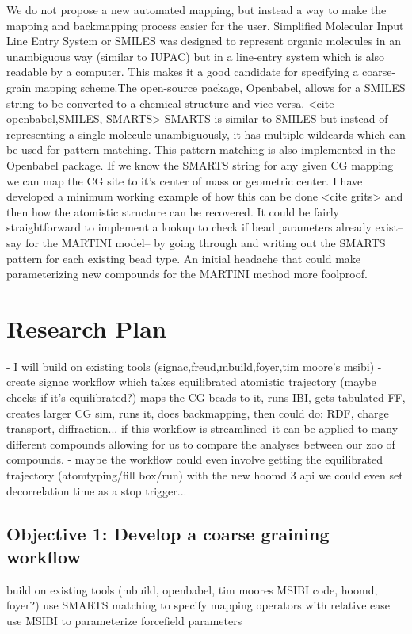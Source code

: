 We do not propose a new automated mapping, but instead a way to make the mapping and backmapping process easier for the user.
Simplified Molecular Input Line Entry System or SMILES \cite{Weininger} was designed to represent organic molecules in an unambiguous way (similar to IUPAC) but in a line-entry system which is also readable by a computer.
This makes it a good candidate for specifying a coarse-grain mapping scheme.The open-source package, Openbabel, allows for a SMILES string to be converted to a chemical structure and vice versa.
<cite openbabel,SMILES, SMARTS> SMARTS is similar to SMILES but instead of representing a single molecule unambiguously, it has multiple wildcards which can be used for pattern matching.
This pattern matching is also implemented in the Openbabel package.
If we know the SMARTS string for any given CG mapping we can map the CG site to it's center of mass or geometric center.
I have developed a minimum working example of how this can be done <cite grits> and then how the atomistic structure can be recovered.
It could be fairly straightforward to implement a lookup to check if bead parameters already exist--say for the MARTINI model-- by going through and writing out the SMARTS pattern for each existing bead type.
An initial headache that could make parameterizing new compounds for the MARTINI method more foolproof.

\section*{Research Plan}
- I will build on existing tools (signac,freud,mbuild,foyer,tim moore's msibi)
- create signac workflow which takes equilibrated atomistic trajectory (maybe checks if it's equilibrated?) maps the CG beads to it, runs IBI, gets tabulated FF, creates larger CG sim, runs it, does backmapping, then could do: RDF, charge transport, diffraction...
if this workflow is streamlined--it can be applied to many different compounds allowing for us to compare the analyses between our zoo of compounds.
- maybe the workflow could even involve getting the equilibrated trajectory (atomtyping/fill box/run) with the new hoomd 3 api we could even set decorrelation time as a stop trigger...

\subsection*{Objective 1: Develop a coarse graining workflow}
build on existing tools (mbuild, openbabel, tim moores MSIBI code, hoomd, foyer?)
use SMARTS matching to specify mapping operators with relative ease
use MSIBI to parameterize forcefield parameters

